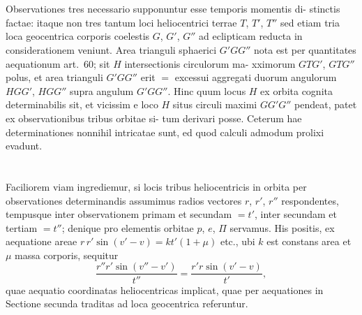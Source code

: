 \documentclass[12pt,a4paper]{article}
\begin{document}
\section{}

Observationes tres necessario supponuntur esse temporis momentis di-
stinctis factae: itaque non tres tantum loci heliocentrici terrae $T$, $T'$, $T''$
sed etiam tria loca geocentrica corporis coelestis $G$, $G'$, $G''$ ad eclipticam
reducta in considerationem veniunt. Area trianguli sphaerici $G'GG''$ nota
est per quantitates aequationum art.~60; sit $H$ intersectionis circulorum ma-
xximorum $GTG'$, $GTG''$ polus, et area trianguli $G'GG''$ erit $=$ excessui
aggregati duorum angulorum $HGG'$, $HGG''$ supra angulum $G'GG''$. Hinc
quum locus $H$ ex orbita cognita determinabilis sit, et vicissim e loco $H$ situs
circuli maximi $GG'G''$ pendeat, patet ex observationibus tribus orbitae si-
tum derivari posse. Ceterum hae determinationes nonnihil intricatae sunt,
ed quod calculi admodum prolixi evadunt.

\section{}

Faciliorem viam ingrediemur, si locis tribus heliocentricis in orbita per
observationes determinandis assumimus radios vectores $r$, $r'$, $r''$ respondentes,
tempusque inter observationem primam et secundam $= t'$, inter secundam et
tertiam $= t''$; denique pro elementis orbitae $p$, $e$, $\Pi$ servamus. His positis,
ex aequatione areae $r\,r'\sin(v' - v) = kt'(1 + \mu)$ etc., ubi $k$ est constans
area et $\mu$ massa corporis, sequitur
\begin{equation}
\frac{r''r'\sin(v'' - v')}{t''} = \frac{r'r\sin(v' - v)}{t'},
\end{equation}
quae aequatio coordinatas heliocentricas implicat, quae per aequationes in
Sectione secunda traditas ad loca geocentrica referuntur.

\end{document}
